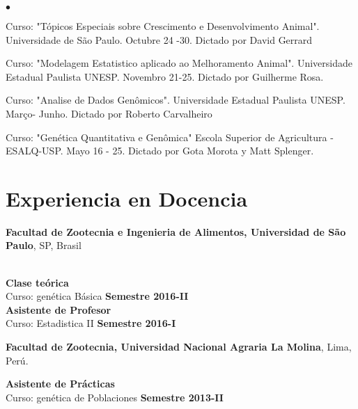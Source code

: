 \documentclass[margin,line,10pt]{res}
\newenvironment{list2}{
  \begin{list}{$\bullet$}{%
      \setlength{\itemsep}{0in}
      \setlength{\parsep}{0in} \setlength{\parskip}{0in}
      \setlength{\topsep}{0in} \setlength{\partopsep}{0in} 
      \setlength{\leftmargin}{0.2in}}}{\end{list}}
\begin{document}
\begin{resume}
\begin{list2}
\item Curso: "Tópicos Especiais sobre Crescimento e Desenvolvimento Animal". Universidade de São Paulo. Octubre 24 -30. 
Dictado por David Gerrard
\vspace{0.5cm}
\item Curso: "Modelagem Estatistico aplicado ao Melhoramento Animal". Universidade Estadual Paulista UNESP. Novembro 21-25. 
Dictado por Guilherme Rosa. 
\vspace{0.5cm}
\item Curso: "Analise de Dados Genômicos". Universidade Estadual Paulista UNESP. Março- Junho. 
Dictado por Roberto Carvalheiro
\vspace{0.5cm}
\item Curso: "Genética Quantitativa e Genômica" Escola Superior de Agricultura - ESALQ-USP. Mayo 16 - 25.
Dictado por Gota Morota y Matt Splenger.
\end{list2}  
\vspace{0.5cm}


\vspace{0.5cm}
\section{\sc Experiencia en Docencia}



{\bf Facultad de Zootecnia e Ingenieria de Alimentos, Universidad de São Paulo}, SP, Brasil\\\

\vspace{.01pt}
\textbf{Clase teórica}\\
Curso: genética Básica     \hfill {\bf Semestre 2016-II} \\

\vspace{.01pt}
\textbf{Asistente de Profesor} \\
Curso: Estadistica II     \hfill {\bf Semestre 2016-I}\\
\vspace{0.5cm}


{\bf Facultad de Zootecnia, Universidad Nacional Agraria La Molina}, Lima, Perú.\\
\vspace{.01pt}

\textbf{Asistente de Prácticas} \\
Curso: genética de Poblaciones     \hfill {\bf Semestre 2013-II} \\
\vspace{0.5cm}



\end{resume}
\end{document}
